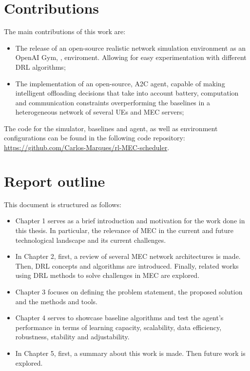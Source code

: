 \section{Contributions}
\noindent The main contributions of this work are:
\begin{itemize}
    \item The release of an open-source realistic network simulation environment as an OpenAI Gym, \cite{opengym}, enviroment. Allowing for easy experimentation with different \acrshort{DRL} algorithms;
    \item The implementation of an open-source, \acrshort{A2C} agent, capable of making intelligent offloading decisions that take into account battery, computation and communication constraints overperforming the baselines in a heterogeneous network of several \acrshort{UE}s and \acrshort{MEC} servers;
\end{itemize}

The code for the simulator, baselines and agent, as well as environment configurations can be found in the following code repository:
\href{https://github.com/Carlos-Marques/rl-MEC-scheduler}{https://github.com/Carlos-Marques/rl-MEC-scheduler}.

\section{Report outline}
\noindent This document is structured as follows:
\begin{itemize}
    \item Chapter 1 serves as a brief introduction and motivation for the work done in this thesis. In particular, the relevance of \acrshort{MEC} in the current and future technological landscape and its current challenges.
    \item In Chapter 2, first, a review of several \acrshort{MEC} network architectures is made. Then, \acrshort{DRL} concepts  and  algorithms  are  introduced. Finally, related works using \acrshort{DRL} methods to solve challenges in \acrshort{MEC} are explored.
    \item Chapter 3 focuses on defining the problem statement, the proposed solution and the methods and tools.
    \item Chapter 4 serves to showcase baseline algorithms and test the agent's performance in terms of learning capacity, scalability, data efficiency, robustness, stability and adjustability. 
    \item In Chapter 5, first, a summary about this work is made. Then future work is explored.
\end{itemize}







 





